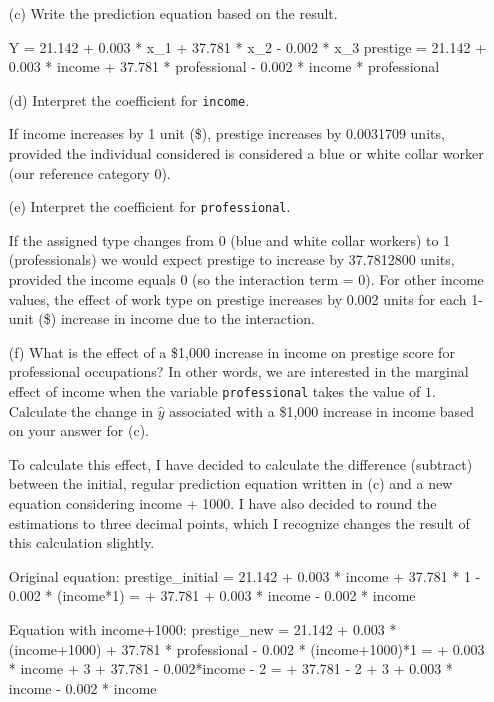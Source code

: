 \documentclass[12pt,letterpaper]{article}
\begin{document}
\begin{enumerate}
	\item [(c)]
	Write the prediction equation based on the result.
	
	Y = 21.142 + 0.003 * x\_1 + 37.781 * x\_2 - 0.002 * x\_3 \newline
	prestige = 21.142 + 0.003 * income + 37.781 * professional - 0.002 * income * professional
	
\newpage
	\item [(d)]
	Interpret the coefficient for \texttt{income}.
	
	If income increases by 1 unit (\$), prestige increases by 0.0031709 units, provided the individual considered is considered  a blue or white collar worker (our reference category 0). 
	
	\item [(e)]
	Interpret the coefficient for \texttt{professional}.
	
	If the assigned type changes from 0 (blue and white collar workers) to 1 (professionals) we would expect prestige to increase by 37.7812800 units, provided the income equals 0 (so the interaction term = 0). For other income values, the effect of work type on prestige increases by 0.002 units for each 1-unit (\$) increase in income due to the interaction.
	
	\item [(f)]
	What is the effect of a \$1,000 increase in income on prestige score for professional occupations? In other words, we are interested in the marginal effect of income when the variable \texttt{professional} takes the value of $1$. Calculate the change in $\hat{y}$ associated with a \$1,000 increase in income based on your answer for (c).
	
	To calculate this effect, I have decided to calculate the difference (subtract) between the initial, regular prediction equation written in (c) and a new equation considering income + 1000. I have also decided to round the estimations to three decimal points, which I recognize changes the result of this calculation slightly.
	
	Original equation: \newline
	prestige\_initial = 21.142 + 0.003 * income + 37.781 * 1 - 0.002 * (income*1) =  + 37.781 + 0.003 * income - 0.002 * income
	
	Equation with income+1000: \newline
	prestige\_new = 21.142 + 0.003 * (income+1000) + 37.781 * professional - 0.002 * (income+1000)*1 =  + 0.003 * income + 3 + 37.781 - 0.002*income - 2 =  + 37.781 - 2 + 3 + 0.003 * income - 0.002 * income
	

\end{enumerate}
\end{document}
